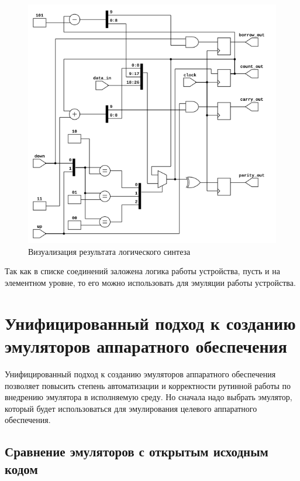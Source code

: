 \begin{figure}[!htbp]
    \centering
    \begin{adjustbox}{max totalsize={0.8\textwidth}{0.8\textheight}}
        \includegraphics[]{images/netlist.png}
    \end{adjustbox}
    \caption{Визуализация результата логического синтеза}\label{fig:emu-creation-pro}
\end{figure}


Так как в списке соединений заложена логика работы устройства, пусть и на элементном уровне,
то его можно использовать для эмуляции работы устройства.


\section{Унифицированный подход к созданию эмуляторов аппаратного обеспечения}\label{sec:ch1/sec4}

Унифицированный подход к созданию эмуляторов аппаратного обеспечения позволяет
повысить степень автоматизации и корректности рутинной работы по внедрению
эмулятора в исполняемую среду. Но сначала надо выбрать эмулятор, который
будет использоваться для эмулирования целевого аппаратного обеспечения.

\subsection{Сравнение эмуляторов с открытым исходным кодом}\label{sec:ch1/sec4/sub1}


